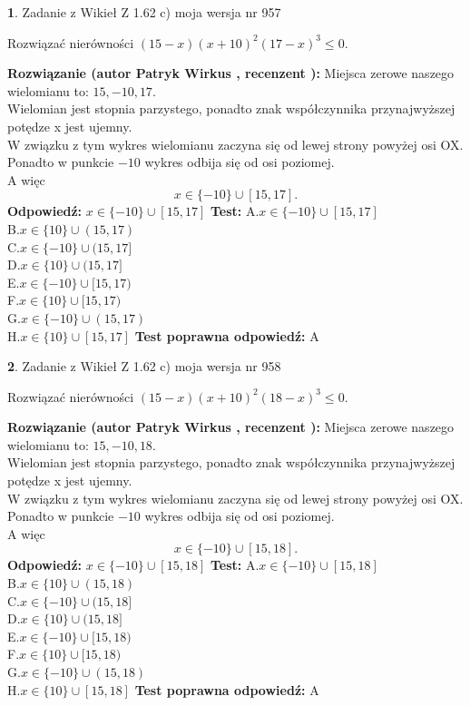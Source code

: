 \documentclass[12pt, a4paper]{article}
\theoremstyle{definition} %
\newtheorem{zad}{}
\newcommand{\zadStart}[1]{\begin{zad}#1\newline}
\newcommand{\zadStop}{\end{zad}}
\newcommand{\rozwStart}[2]{\noindent \textbf{Rozwiązanie (autor #1 , recenzent #2): }\newline}
\newcommand{\rozwStop}{\newline}
\newcommand{\odpStart}{\noindent \textbf{Odpowiedź:}\newline}
\newcommand{\odpStop}{\newline}
\newcommand{\testStart}{\noindent \textbf{Test:}\newline}
\newcommand{\testStop}{\newline}
\newcommand{\kluczStart}{\noindent \textbf{Test poprawna odpowiedź:}\newline}
\newcommand{\kluczStop}{\newline}
\begin{document}
\zadStart{Zadanie z Wikieł Z 1.62 c) moja wersja nr 957}

Rozwiązać nierówności $(15-x)(x+10)^{2}(17-x)^{3}\le0$.
\zadStop
\rozwStart{Patryk Wirkus}{}
Miejsca zerowe naszego wielomianu to: $15, -10, 17$.\\
Wielomian jest stopnia parzystego, ponadto znak współczynnika przy\linebreak najwyższej potędze x jest ujemny.\\ W związku z tym wykres wielomianu zaczyna się od lewej strony powyżej osi OX.\\
Ponadto w punkcie $-10$ wykres odbija się od osi poziomej.\\
A więc $$x \in \{-10\} \cup [15,17].$$
\rozwStop
\odpStart
$x \in \{-10\} \cup [15,17]$
\odpStop
\testStart
A.$x \in \{-10\} \cup [15,17]$\\
B.$x \in \{10\} \cup (15,17)$\\
C.$x \in \{-10\} \cup (15,17]$\\
D.$x \in \{10\} \cup (15,17]$\\
E.$x \in \{-10\} \cup [15,17)$\\
F.$x \in \{10\} \cup [15,17)$\\
G.$x \in \{-10\} \cup (15,17)$\\
H.$x \in \{10\} \cup [15,17]$
\testStop
\kluczStart
A
\kluczStop



\zadStart{Zadanie z Wikieł Z 1.62 c) moja wersja nr 958}

Rozwiązać nierówności $(15-x)(x+10)^{2}(18-x)^{3}\le0$.
\zadStop
\rozwStart{Patryk Wirkus}{}
Miejsca zerowe naszego wielomianu to: $15, -10, 18$.\\
Wielomian jest stopnia parzystego, ponadto znak współczynnika przy\linebreak najwyższej potędze x jest ujemny.\\ W związku z tym wykres wielomianu zaczyna się od lewej strony powyżej osi OX.\\
Ponadto w punkcie $-10$ wykres odbija się od osi poziomej.\\
A więc $$x \in \{-10\} \cup [15,18].$$
\rozwStop
\odpStart
$x \in \{-10\} \cup [15,18]$
\odpStop
\testStart
A.$x \in \{-10\} \cup [15,18]$\\
B.$x \in \{10\} \cup (15,18)$\\
C.$x \in \{-10\} \cup (15,18]$\\
D.$x \in \{10\} \cup (15,18]$\\
E.$x \in \{-10\} \cup [15,18)$\\
F.$x \in \{10\} \cup [15,18)$\\
G.$x \in \{-10\} \cup (15,18)$\\
H.$x \in \{10\} \cup [15,18]$
\testStop
\kluczStart
A
\kluczStop
\end{document}
